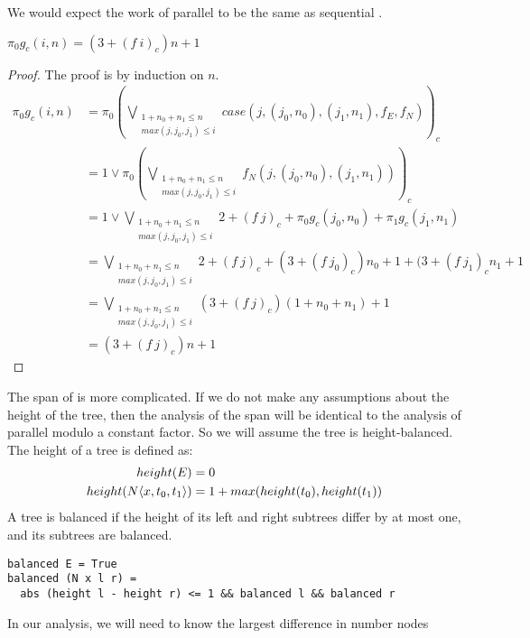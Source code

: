 %
We would expect the work of parallel  to be the same as sequential .
%
\begin{lemma}
  $\pi_0 g_c(i,n) = (3 + (f\ i)_c)n + 1$
\end{lemma}
\begin{proof}
  The proof is by induction on $n$.
  \begin{align*}
    \pi_0g_c(i,n) &= \pi_0 (\bigvee\limits_{\substack{1 + n_0 + n_1 \leq n \\ max(j,j_0,j_1) \leq i}} case(j,(j_0,n_0),(j_1,n_1), f_E, f_N))_c \\
                  &= 1 \vee \pi_0 (\bigvee\limits_{\substack{1 + n_0 + n_1 \leq n \\ max(j,j_0,j_1) \leq i}} f_N(j,(j_0,n_0),(j_1,n_1)))_c \\
                  &= 1 \vee \bigvee\limits_{\substack{1 + n_0 + n_1 \leq n \\ max(j,j_0,j_1) \leq i}} 2 + (f\ j)_c + \pi_0 g_c(j_0,n_0) + \pi_1 g_c(j_1,n_1) \\
                  &= \bigvee\limits_{\substack{1 + n_0 + n_1 \leq n \\ max(j,j_0,j_1) \leq i}} 2 + (f\ j)_c + (3 + (f\ j_0)_c) n_0 + 1 + (3 + (f\ j_1)_c n_1 + 1 \\
                  &= \bigvee\limits_{\substack{1 + n_0 + n_1 \leq n \\ max(j,j_0,j_1) \leq i}} (3 + (f\ j)_c)(1 + n_0 + n_1) + 1  \\
                  &= (3 + (f\ j)_c)n + 1
  \end{align*}
\end{proof}
%
The span of  is more complicated. If we do not make any assumptions
about the height of the tree, then the analysis of the span will be identical
to the analysis of parallel  modulo a constant factor. So we will
assume the tree is height-balanced. The height of a tree is defined as:
%
\begin{align*}
  height(E) &= 0\\
  height(N\langle x,t_0,t_1\rangle) &= 1 + max(height(t_0), height(t_1))
\end{align*}
%
A tree is balanced if the height of its left and right subtrees differ by at
most one, and its subtrees are balanced.
%
\begin{lstlisting}
balanced E = True
balanced (N x l r) =
  abs (height l - height r) <= 1 && balanced l && balanced r
\end{lstlisting}
%
In our analysis, we will need to know the largest difference in number nodes
